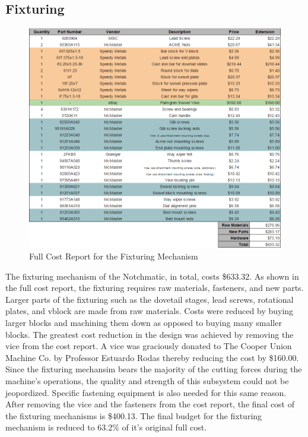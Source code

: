 \newpage

\subsection{Fixturing}

\begin{figure}[H]
    \centering
    \includegraphics[width=1.0\textwidth]{./fall-report pictures/Chapter4-BillofMaterials/CRF}
    \caption{Full Cost Report for the Fixturing Mechanism}
    \label{fig:CRD}
\end{figure}

The fixturing mechanism of the Notchmatic, in total, costs \$633.32. As shown in the full cost report, the fixturing requires raw materials, fasteners, and new parts. Larger parts of the fixturing such as the dovetail stages, lead screws, rotational plates, and vblock are made from raw materials. Costs were reduced by buying larger blocks and machining them down as opposed to buying many smaller blocks. The greatest cost reduction in the design was achieved by removing the vice from the cost report. A vice was graciously donated to The Cooper Union Machine Co. by Professor Estuardo Rodas thereby reducing the cost by \$160.00. Since the fixturing mechansim bears the majority of the cutting forces during the machine's operations, the quality and strength of this subsystem could not be jeopordized. Specific fastening equipment is also needed for this same reason. After removing the vice and the fasteners from the cost report, the final cost of the fixturing mechanisms is \$400.13. The final budget for the fixturing mechanism is reduced to 63.2\% of it's original full cost.  


